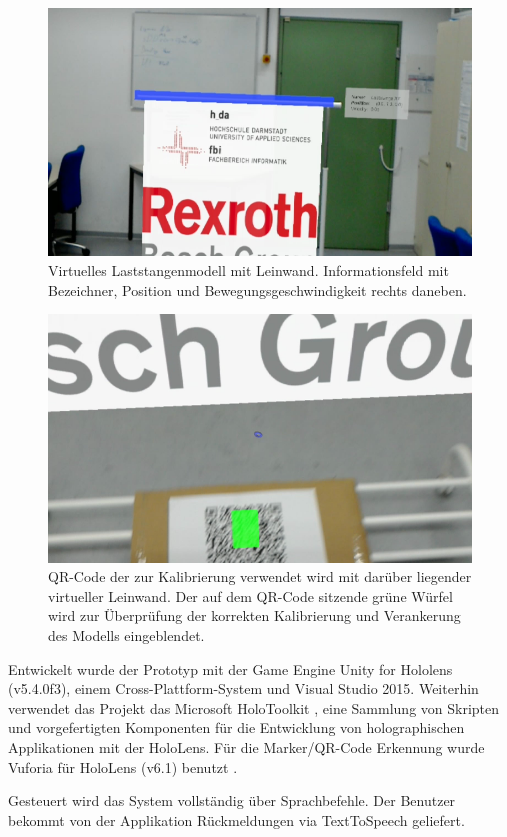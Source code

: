 \documentclass[conference, 11pt]{IEEEtran}
\begin{document}
\begin{figure} 
	\centering
	\includegraphics[width=\columnwidth]{Modell}
	\caption{Virtuelles Laststangenmodell mit Leinwand. Informationsfeld mit Bezeichner, Position und Bewegungsgeschwindigkeit rechts daneben.}
\label{Modell}
\end{figure}

\begin{figure}
	\centering
	\includegraphics[width=\columnwidth]{Marker}
	\caption{QR-Code der zur Kalibrierung verwendet wird mit darüber liegender virtueller Leinwand. Der auf dem QR-Code sitzende grüne Würfel wird zur Überprüfung der korrekten Kalibrierung und Verankerung des Modells eingeblendet.}
\label{Marker}
\end{figure}

Entwickelt wurde der Prototyp mit der Game Engine Unity for Hololens (v5.4.0f3), einem Cross-Plattform-System \cite{Unity} und Visual Studio 2015. Weiterhin verwendet das Projekt das Microsoft HoloToolkit \cite{Toolkit}, eine Sammlung von Skripten und vorgefertigten Komponenten für die Entwicklung von holographischen Applikationen mit der HoloLens. Für die Marker/QR-Code Erkennung wurde Vuforia für HoloLens (v6.1) benutzt \cite{Vuforia}.\par
Gesteuert wird das System vollständig über Sprachbefehle. Der Benutzer bekommt von der Applikation Rückmeldungen via TextToSpeech geliefert.  
\end{document}
